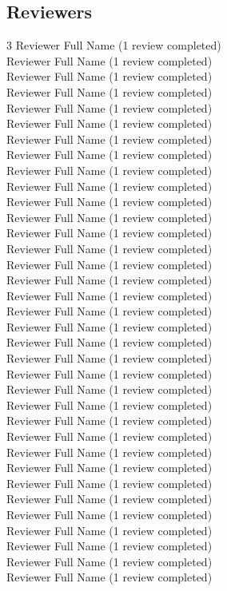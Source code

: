 \subsection{Reviewers}
\begin{multicols}{3}
Reviewer Full Name (1 review completed)\\
Reviewer Full Name (1 review completed)\\
Reviewer Full Name (1 review completed)\\
Reviewer Full Name (1 review completed)\\
Reviewer Full Name (1 review completed)\\
Reviewer Full Name (1 review completed)\\
Reviewer Full Name (1 review completed)\\
Reviewer Full Name (1 review completed)\\
Reviewer Full Name (1 review completed)\\
Reviewer Full Name (1 review completed)\\
Reviewer Full Name (1 review completed)\\
Reviewer Full Name (1 review completed)\\
Reviewer Full Name (1 review completed)\\
Reviewer Full Name (1 review completed)\\
Reviewer Full Name (1 review completed)\\
Reviewer Full Name (1 review completed)\\
Reviewer Full Name (1 review completed)\\
Reviewer Full Name (1 review completed)\\
Reviewer Full Name (1 review completed)\\
Reviewer Full Name (1 review completed)\\
Reviewer Full Name (1 review completed)\\
Reviewer Full Name (1 review completed)\\
Reviewer Full Name (1 review completed)\\
Reviewer Full Name (1 review completed)\\
Reviewer Full Name (1 review completed)\\
Reviewer Full Name (1 review completed)\\
Reviewer Full Name (1 review completed)\\
Reviewer Full Name (1 review completed)\\
Reviewer Full Name (1 review completed)\\
Reviewer Full Name (1 review completed)\\
Reviewer Full Name (1 review completed)\\
Reviewer Full Name (1 review completed)\\
Reviewer Full Name (1 review completed)\\
Reviewer Full Name (1 review completed)\\
Reviewer Full Name (1 review completed)\\
\end{multicols}
